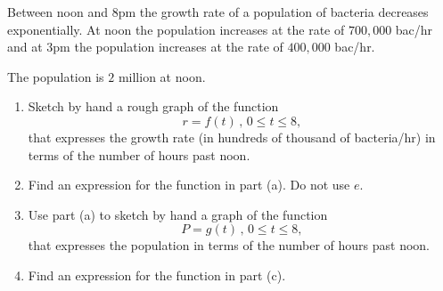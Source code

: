 \documentclass{ximera}
\begin{document}
\begin{question} \label{QKdfrerr3}
Between noon and 8pm the growth rate of a population of bacteria decreases exponentially. At noon the population increases at the rate of $700,000$ bac/hr and at 3pm the population increases at the rate of $400,000$ bac/hr. 

The population is $2$ million at noon.

\begin{enumerate}

\item Sketch by hand a rough graph of the function
\[
    r = f(t) \, , \, 0\leq t \leq 8,
\]
that expresses the growth rate (in hundreds of thousand of bacteria/hr) in terms of the number of hours past noon.

\item Find an expression for the function in part (a). Do not use $e$.

\item Use part (a) to sketch by hand a graph of the function 
\[
 P=g(t) \, , \, 0\leq t \leq 8, 
\]
that expresses the population in terms of the number of hours past noon.

\item Find an expression for the function in part (c).

\end{enumerate}
\end{question}
\end{document}

